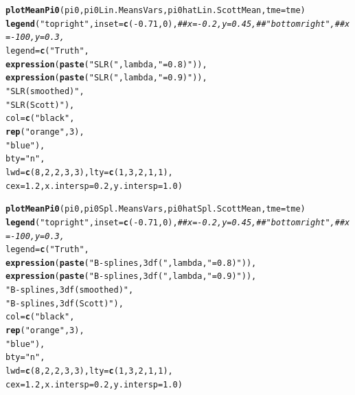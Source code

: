 \documentclass{article}\usepackage[]{graphicx}\usepackage[]{color}
\makeatletter
\newcommand{\hlnum}[1]{\textcolor[rgb]{0.686,0.059,0.569}{#1}}%
\newcommand{\hlstr}[1]{\textcolor[rgb]{0.192,0.494,0.8}{#1}}%
\newcommand{\hlcom}[1]{\textcolor[rgb]{0.678,0.584,0.686}{\textit{#1}}}%
\newcommand{\hlopt}[1]{\textcolor[rgb]{0,0,0}{#1}}%
\newcommand{\hlstd}[1]{\textcolor[rgb]{0.345,0.345,0.345}{#1}}%
\newcommand{\hlkwc}[1]{\textcolor[rgb]{0.333,0.667,0.333}{#1}}%
\newcommand{\hlkwd}[1]{\textcolor[rgb]{0.737,0.353,0.396}{\textbf{#1}}}%
\newenvironment{kframe}{%
 \def\at@end@of@kframe{}%
 \ifinner\ifhmode%
  \def\at@end@of@kframe{\end{minipage}}%
  \begin{minipage}{\columnwidth}%
 \fi\fi%
 \def\FrameCommand##1{\hskip\@totalleftmargin \hskip-\fboxsep
 \colorbox{shadecolor}{##1}\hskip-\fboxsep
     \hskip-\linewidth \hskip-\@totalleftmargin \hskip\columnwidth}%
 \MakeFramed {\advance\hsize-\width
   \@totalleftmargin\z@ \linewidth\hsize
   \@setminipage}}%
 {\par\unskip\endMakeFramed%
 \at@end@of@kframe}
\newenvironment{knitrout}{}{} %
\makeatother
\begin{document}
\begin{knitrout}
\begin{kframe}
\begin{alltt}
  \hlkwd{plotMeanPi0}\hlstd{(pi0, pi0Lin.MeansVars, pi0hatLin.ScottMean,} \hlkwc{tme}\hlstd{=tme)}
  \hlkwd{legend}\hlstd{(}\hlstr{"topright"}\hlstd{,} \hlkwc{inset}\hlstd{=}\hlkwd{c}\hlstd{(}\hlopt{-}\hlnum{0.71}\hlstd{,}\hlnum{0}\hlstd{),}\hlcom{##x=-0.2, y=0.45,##"bottomright", ##x=-100, y=0.3, }
         \hlkwc{legend}\hlstd{=}\hlkwd{c}\hlstd{(}\hlstr{"Truth"}\hlstd{,}
                  \hlkwd{expression}\hlstd{(}\hlkwd{paste}\hlstd{(}\hlstr{"SLR ("}\hlstd{, lambda,} \hlstr{"=0.8)"}\hlstd{)),}
                  \hlkwd{expression}\hlstd{(}\hlkwd{paste}\hlstd{(}\hlstr{"SLR ("}\hlstd{, lambda,} \hlstr{"=0.9)"}\hlstd{)),}
                  \hlstr{"SLR (smoothed)"}\hlstd{,}
                  \hlstr{"SLR (Scott)"}\hlstd{),}
         \hlkwc{col}\hlstd{=}\hlkwd{c}\hlstd{(}\hlstr{"black"}\hlstd{,}
               \hlkwd{rep}\hlstd{(}\hlstr{"orange"}\hlstd{,}\hlnum{3}\hlstd{),}
               \hlstr{"blue"}\hlstd{),}
         \hlkwc{bty}\hlstd{=}\hlstr{"n"}\hlstd{,}
         \hlkwc{lwd}\hlstd{=}\hlkwd{c}\hlstd{(}\hlnum{8}\hlstd{,}\hlnum{2}\hlstd{,}\hlnum{2}\hlstd{,}\hlnum{3}\hlstd{,}\hlnum{3}\hlstd{),} \hlkwc{lty}\hlstd{=}\hlkwd{c}\hlstd{(}\hlnum{1}\hlstd{,}\hlnum{3}\hlstd{,}\hlnum{2}\hlstd{,}\hlnum{1}\hlstd{,}\hlnum{1}\hlstd{),}
         \hlkwc{cex}\hlstd{=}\hlnum{1.2}\hlstd{,} \hlkwc{x.intersp}\hlstd{=}\hlnum{0.2}\hlstd{,} \hlkwc{y.intersp}\hlstd{=}\hlnum{1.0}\hlstd{)}

  \hlkwd{plotMeanPi0}\hlstd{(pi0, pi0Spl.MeansVars, pi0hatSpl.ScottMean,} \hlkwc{tme}\hlstd{=tme)}
  \hlkwd{legend}\hlstd{(}\hlstr{"topright"}\hlstd{,} \hlkwc{inset}\hlstd{=}\hlkwd{c}\hlstd{(}\hlopt{-}\hlnum{0.71}\hlstd{,}\hlnum{0}\hlstd{),}\hlcom{##x=-0.2, y=0.45,##"bottomright", ##x=-100, y=0.3, }
         \hlkwc{legend}\hlstd{=}\hlkwd{c}\hlstd{(}\hlstr{"Truth"}\hlstd{,}
                  \hlkwd{expression}\hlstd{(}\hlkwd{paste}\hlstd{(}\hlstr{"B-splines, 3 df ("}\hlstd{, lambda,} \hlstr{"=0.8)"}\hlstd{)),}
                  \hlkwd{expression}\hlstd{(}\hlkwd{paste}\hlstd{(}\hlstr{"B-splines, 3 df ("}\hlstd{, lambda,} \hlstr{"=0.9)"}\hlstd{)),}
                  \hlstr{"B-splines, 3 df (smoothed)"}\hlstd{,}
                  \hlstr{"B-splines, 3 df (Scott)"}\hlstd{),}
         \hlkwc{col}\hlstd{=}\hlkwd{c}\hlstd{(}\hlstr{"black"}\hlstd{,}
               \hlkwd{rep}\hlstd{(}\hlstr{"orange"}\hlstd{,}\hlnum{3}\hlstd{),}
               \hlstr{"blue"}\hlstd{),}
         \hlkwc{bty}\hlstd{=}\hlstr{"n"}\hlstd{,}
         \hlkwc{lwd}\hlstd{=}\hlkwd{c}\hlstd{(}\hlnum{8}\hlstd{,}\hlnum{2}\hlstd{,}\hlnum{2}\hlstd{,}\hlnum{3}\hlstd{,}\hlnum{3}\hlstd{),} \hlkwc{lty}\hlstd{=}\hlkwd{c}\hlstd{(}\hlnum{1}\hlstd{,}\hlnum{3}\hlstd{,}\hlnum{2}\hlstd{,}\hlnum{1}\hlstd{,}\hlnum{1}\hlstd{),}
         \hlkwc{cex}\hlstd{=}\hlnum{1.2}\hlstd{,} \hlkwc{x.intersp}\hlstd{=}\hlnum{0.2}\hlstd{,} \hlkwc{y.intersp}\hlstd{=}\hlnum{1.0}\hlstd{)}


\end{alltt}
\end{kframe}
\end{knitrout}
\end{document}
